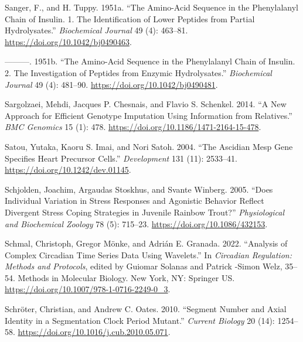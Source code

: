 \documentclass[
]{book}
\newlength{\cslhangindent}
\newlength{\cslentryspacingunit} %
\newenvironment{CSLReferences}[2] %
 {%
  \setlength{\parindent}{0pt}
  \ifodd #1
  \let\oldpar\par
  \def\par{\hangindent=\cslhangindent\oldpar}
  \fi
  \setlength{\parskip}{#2\cslentryspacingunit}
 }%
 {}
\begin{document}
\begin{CSLReferences}{1}{0}
\leavevmode{}%
Sanger, F., and H. Tuppy. 1951a. {``The Amino-Acid Sequence in the Phenylalanyl Chain of Insulin. 1. {The} Identification of Lower Peptides from Partial Hydrolysates.''} \emph{Biochemical Journal} 49 (4): 463--81. \url{https://doi.org/10.1042/bj0490463}.

\leavevmode{}%
---------. 1951b. {``The Amino-Acid Sequence in the Phenylalanyl Chain of Insulin. 2. {The} Investigation of Peptides from Enzymic Hydrolysates.''} \emph{Biochemical Journal} 49 (4): 481--90. \url{https://doi.org/10.1042/bj0490481}.

\leavevmode{}%
Sargolzaei, Mehdi, Jacques P. Chesnais, and Flavio S. Schenkel. 2014. {``A New Approach for Efficient Genotype Imputation Using Information from Relatives.''} \emph{BMC Genomics} 15 (1): 478. \url{https://doi.org/10.1186/1471-2164-15-478}.

\leavevmode{}%
Satou, Yutaka, Kaoru S. Imai, and Nori Satoh. 2004. {``The Ascidian {Mesp} Gene Specifies Heart Precursor Cells.''} \emph{Development} 131 (11): 2533--41. \url{https://doi.org/10.1242/dev.01145}.

\leavevmode{}%
Schjolden, Joachim, Argaudas Stoskhus, and Svante Winberg. 2005. {``Does {Individual Variation} in {Stress Responses} and {Agonistic Behavior Reflect Divergent Stress Coping Strategies} in {Juvenile Rainbow Trout}?''} \emph{Physiological and Biochemical Zoology} 78 (5): 715--23. \url{https://doi.org/10.1086/432153}.

\leavevmode{}%
Schmal, Christoph, Gregor Mönke, and Adrián E. Granada. 2022. {``Analysis of {Complex Circadian Time Series Data Using Wavelets}.''} In \emph{Circadian {Regulation}: {Methods} and {Protocols}}, edited by Guiomar Solanas and Patrick -Simon Welz, 35--54. Methods in {Molecular Biology}. {New York, NY}: {Springer US}. \url{https://doi.org/10.1007/978-1-0716-2249-0_3}.

\leavevmode{}%
Schröter, Christian, and Andrew C. Oates. 2010. {``Segment {Number} and {Axial Identity} in a {Segmentation Clock Period Mutant}.''} \emph{Current Biology} 20 (14): 1254--58. \url{https://doi.org/10.1016/j.cub.2010.05.071}.


\end{CSLReferences}
\end{document}
